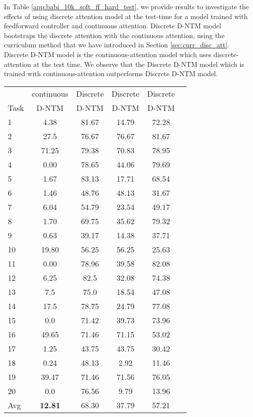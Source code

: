 \documentclass[12pt]{article}
\begin{document}
In Table \ref{app:babi_10k_soft_ff_hard_test}, we provide results to investigate the effects of using discrete attention model at the test-time for a model trained with feedforward controller and continuous attention. Discrete D-NTM model bootstraps the discrete attention with the continuous attention, using the curriculum method that we have introduced in Section \ref{sec:curr_disc_att}. Discrete D-NTM model is the continuous-attention model which uses discrete-attention at the test time. We observe that the Discrete D-NTM model which is trained with continuous-attention outperforms Discrete D-NTM model.

\begin{table*}[htbp]
\vspace{-2mm}
  \centering
  \footnotesize 
\begin{tabular}{ | l || c |c | c | c | c |}
\hline
&  continuous & Discrete & Discrete & Discrete  \\
Task & D-NTM & D-NTM  & D-NTM & D-NTM\\ \hline

1 &4.38 & 81.67 & 14.79 & 72.28\\
2 & 27.5 & 76.67 & 76.67 & 81.67 \\
3 & 71.25 & 79.38 & 70.83 & 78.95 \\
4 &0.00 & 78.65 & 44.06 & 79.69 \\
5 &1.67 & 83.13 & 17.71 & 68.54 \\
6 & 1.46 & 48.76 & 48.13 & 31.67 \\
7 & 6.04 & 54.79 & 23.54 & 49.17 \\
8 & 1.70 & 69.75 & 35.62 & 79.32 \\
9 & 0.63 & 39.17 & 14.38 & 37.71 \\
10 & 19.80 & 56.25 & 56.25 & 25.63 \\
11 & 0.00 & 78.96 & 39.58 & 82.08 \\
12 & 6.25 & 82.5 & 32.08 & 74.38 \\
13  & 7.5 & 75.0 & 18.54 & 47.08 \\
14 & 17.5 & 78.75 & 24.79 & 77.08 \\
15 & 0.0 & 71.42 & 39.73 & 73.96 \\
16 & 49.65 & 71.46 & 71.15 & 53.02 \\
17  & 1.25 & 43.75 & 43.75 & 30.42 \\
18 & 0.24 & 48.13 & 2.92 & 11.46\\
19 & 39.47 & 71.46 & 71.56 & 76.05\\
20 & 0.0 & 76.56 & 9.79 & 13.96 \\\hline
Avg & \textbf{12.81} & 68.30 & 37.79 & 57.21 \\\hline

\end{tabular}
\caption{Test error rates (\%) on the 20 bAbI QA tasks for models using 10k training examples with the feedforward controller. Discrete D-NTM model bootstraps the discrete attention with the continuous attention, using the curriculum method that we have introduced in Section \ref{sec:gen_disc_add_vecs}. Discrete D-NTM model is the continuous-attention model which uses discrete-attention at the test time.}
\label{app:babi_10k_soft_ff_hard_test}
\end{table*}
\end{document}
